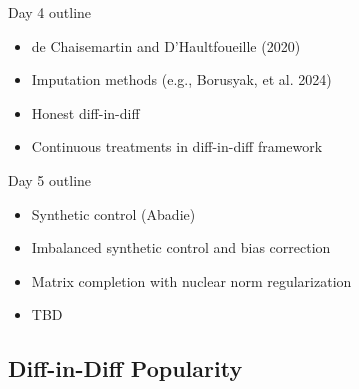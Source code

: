 \documentclass{beamer}
\begin{document}
\begin{frame}{Day 4 outline}

\begin{itemize}

\item de Chaisemartin and D'Haultfoueille (2020)
\item Imputation methods (e.g., Borusyak, et al. 2024)
\item Honest diff-in-diff
\item Continuous treatments in diff-in-diff framework 

\end{itemize}

\end{frame}

\begin{frame}{Day 5 outline}

\begin{itemize}

\item Synthetic control (Abadie)
\item Imbalanced synthetic control and bias correction
\item Matrix completion with nuclear norm regularization
\item TBD

\end{itemize}

\end{frame}




\subsection{Diff-in-Diff Popularity}
\end{document}
